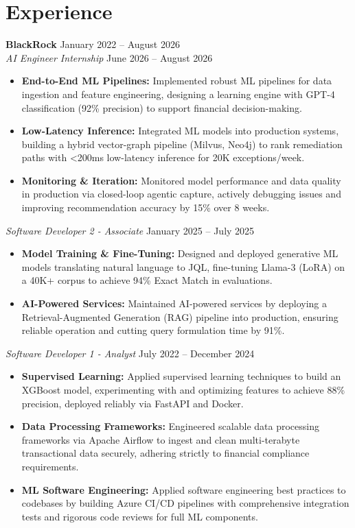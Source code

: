 \documentclass[11pt,a4paper]{article}
\begin{document}
\section{Experience}
\noindent
\textbf{BlackRock} \hfill January 2022 -- August 2026 \\
\textit{AI Engineer Internship} \hfill June 2026 -- August 2026
\begin{itemize}[leftmargin=*,noitemsep,topsep=0pt]
    \item \textbf{End-to-End ML Pipelines:} Implemented robust ML pipelines for data ingestion and feature engineering, designing a learning engine with GPT-4 classification (92\% precision) to support financial decision-making.
    \item \textbf{Low-Latency Inference:} Integrated ML models into production systems, building a hybrid vector-graph pipeline (Milvus, Neo4j) to rank remediation paths with <200ms low-latency inference for 20K exceptions/week.
    \item \textbf{Monitoring \& Iteration:} Monitored model performance and data quality in production via closed-loop agentic capture, actively debugging issues and improving recommendation accuracy by 15\% over 8 weeks.
\end{itemize}

\vspace{3pt}
\noindent
\textit{Software Developer 2 - Associate} \hfill January 2025 -- July 2025
\begin{itemize}[leftmargin=*,noitemsep,topsep=0pt]
    \item \textbf{Model Training \& Fine-Tuning:} Designed and deployed generative ML models translating natural language to JQL, fine-tuning Llama-3 (LoRA) on a 40K+ corpus to achieve 94\% Exact Match in evaluations.
    \item \textbf{AI-Powered Services:} Maintained AI-powered services by deploying a Retrieval-Augmented Generation (RAG) pipeline into production, ensuring reliable operation and cutting query formulation time by 91\%.
\end{itemize}

\vspace{3pt}
\noindent
\textit{Software Developer 1 - Analyst} \hfill July 2022 -- December 2024
\begin{itemize}[leftmargin=*,noitemsep,topsep=0pt]
    \item \textbf{Supervised Learning:} Applied supervised learning techniques to build an XGBoost model, experimenting with and optimizing features to achieve 88\% precision, deployed reliably via FastAPI and Docker.
    \item \textbf{Data Processing Frameworks:} Engineered scalable data processing frameworks via Apache Airflow to ingest and clean multi-terabyte transactional data securely, adhering strictly to financial compliance requirements.
    \item \textbf{ML Software Engineering:} Applied software engineering best practices to codebases by building Azure CI/CD pipelines with comprehensive integration tests and rigorous code reviews for full ML components.
\end{itemize}
\end{document}

